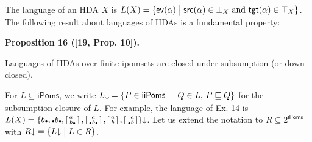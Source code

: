 \documentclass[10pt,a4paper]{article}
\begin{document}
 
 
The language of an HDA $X$ is $L(X)={\{\mathsf{ev}(\alpha)\mathrel{\big{|}}\mathsf{src}(\alpha)\in\bot_{X}\text{ and }\mathsf{tgt}(\alpha)\in\top_{X}\}}$. The following result about languages of HDAs is a fundamental property:\par
 
 
 
\par\medskip\noindent\textbf{Proposition 16 ([19, Prop. 10]).}\par
 
 
Languages of HDAs over finite ipomsets are closed under subsumption (or down-closed).\par
 
 
 
 
For $L\subseteq\mathsf{iPoms}$, we write $L\mathord{\downarrow}={\{P\in\mathsf{iiPoms}\mathrel{\big{|}}\exists Q\in L,\,P\sqsubseteq Q\}}$ for the subsumption closure of $L$. For example, the language of Ex. 14 is $L(X)=\{b\vbox{\hbox{\tiny$\bullet$}},\vbox{\hbox{\tiny$\bullet$}}b\vbox{\hbox{\tiny$\bullet$}},\left[\begin{smallmatrix}a\hphantom{\vbox{\hbox{\tiny$\bullet$}}}\\
b\vbox{\hbox{\tiny$\bullet$}}\end{smallmatrix}\right],\left[\begin{smallmatrix}a\\
\vbox{\hbox{\tiny$\bullet$}}b\vbox{\hbox{\tiny$\bullet$}}\end{smallmatrix}\right],\left[\begin{smallmatrix}a\\
b\end{smallmatrix}\right],\left[\begin{smallmatrix}\hphantom{\vbox{\hbox{\tiny$\bullet$}}}a\\
\vbox{\hbox{\tiny$\bullet$}}b\end{smallmatrix}\right]\}\mathord{\downarrow}$. Let us extend the notation to $R\subseteq 2^{\mathsf{iPoms}}$ with $R\mathord{\downarrow}={\{L\mathord{\downarrow}\mathrel{\big{|}}L\in R\}}$.\par
 
\end{document}
